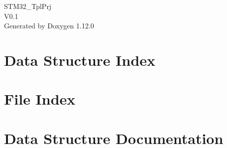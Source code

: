 \documentclass[twoside]{book}
\newcommand{\+}{\discretionary{\mbox{\scriptsize$\hookleftarrow$}}{}{}}
\newcommand{\clearemptydoublepage}{%
    \newpage{\pagestyle{empty}\cleardoublepage}%
  }
\begin{document}
  \raggedbottom
    \hypersetup{pageanchor=false,
                bookmarksnumbered=true,
                pdfencoding=unicode
               }
  \begin{titlepage}
  \vspace*{7cm}
  \begin{center}%
  {\Large STM32\+\_\+\+Tpl\+Prj}\\
  [1ex]\large V0.\+1 \\
  \vspace*{1cm}
  {\large Generated by Doxygen 1.12.0}\\
  \end{center}
  \end{titlepage}
  \clearemptydoublepage
  \tableofcontents
  \clearemptydoublepage
  \hypersetup{pageanchor=true}
\chapter{Data Structure Index}

\chapter{File Index}

\chapter{Data Structure Documentation}
























\end{document}
